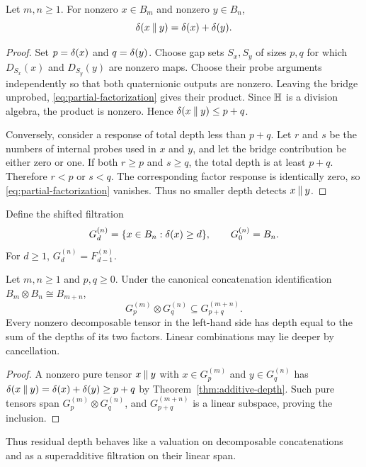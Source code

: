 \begin{theorem}\label{thm:additive-depth}
Let $m,n\ge1$.  For nonzero $x\in B_m$ and nonzero $y\in B_n$,
\begin{equation}\label{eq:additive-depth}
  \delta(x\mathbin{\Vert} y)=\delta(x)+\delta(y).
\end{equation}
\end{theorem}

\begin{proof}
Set $p=\delta(x)$ and $q=\delta(y)$.  Choose gap sets $S_x,S_y$ of sizes $p,q$ for which $D_{S_x}(x)$ and $D_{S_y}(y)$ are nonzero maps.  Choose their probe arguments independently so that both quaternionic outputs are nonzero.  Leaving the bridge unprobed, \eqref{eq:partial-factorization} gives their product.  Since $\mathbb H$ is a division algebra, the product is nonzero.  Hence $\delta(x\mathbin{\Vert} y)\le p+q$.

Conversely, consider a response of total depth less than $p+q$.  Let $r$ and $s$ be the numbers of internal probes used in $x$ and $y$, and let the bridge contribution be either zero or one.  If both $r\ge p$ and $s\ge q$, the total depth is at least $p+q$.  Therefore $r<p$ or $s<q$.  The corresponding factor response is identically zero, so \eqref{eq:partial-factorization} vanishes.  Thus no smaller depth detects $x\mathbin{\Vert} y$.
\end{proof}

Define the shifted filtration
\[
  G_d^{(n)}=\{x\in B_n:\delta(x)\ge d\},
  \qquad G_0^{(n)}=B_n.
\]
For $d\ge1$, $G_d^{(n)}=F_{d-1}^{(n)}$.

\begin{corollary}\label{cor:multiplicative-filtration}
Let $m,n\ge1$ and $p,q\ge0$.  Under the canonical concatenation identification
$B_m\otimes B_n\cong B_{m+n}$,
\[
  G_p^{(m)}\otimes G_q^{(n)}
  \subseteq G_{p+q}^{(m+n)}.
\]
Every nonzero decomposable tensor in the left-hand side has depth equal to the sum of the depths of its two factors.  Linear combinations may lie deeper by cancellation.
\end{corollary}

\begin{proof}
A nonzero pure tensor $x\mathbin{\Vert} y$ with $x\in G_p^{(m)}$ and $y\in G_q^{(n)}$ has
$\delta(x\mathbin{\Vert} y)=\delta(x)+\delta(y)\ge p+q$ by Theorem~\ref{thm:additive-depth}.  Such pure tensors span $G_p^{(m)}\otimes G_q^{(n)}$, and $G_{p+q}^{(m+n)}$ is a linear subspace, proving the inclusion.
\end{proof}

Thus residual depth behaves like a valuation on decomposable concatenations and as a superadditive filtration on their linear span.
